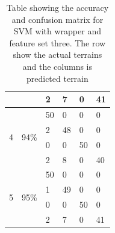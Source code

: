 \documentclass[USenglish]{ifimaster}  %
\begin{document}
\begin{table}[h]
\begin{tabular}{@{}llllll@{}}
			\multicolumn{1}{l|}{} & \multicolumn{1}{l|}{} & \multicolumn{1}{l|}{2} & \multicolumn{1}{l|}{7} & \multicolumn{1}{l|}{0} & 41 \\ \midrule
			\multicolumn{1}{l|}{\multirow{4}{*}{4}} & \multicolumn{1}{l|}{\multirow{4}{*}{94\%}} & \multicolumn{1}{l|}{50} & \multicolumn{1}{l|}{0} & \multicolumn{1}{l|}{0} & 0 \\ \cmidrule(l){3-6} 
			\multicolumn{1}{l|}{} & \multicolumn{1}{l|}{} & \multicolumn{1}{l|}{2} & \multicolumn{1}{l|}{48} & \multicolumn{1}{l|}{0} & 0 \\ \cmidrule(l){3-6} 
			\multicolumn{1}{l|}{} & \multicolumn{1}{l|}{} & \multicolumn{1}{l|}{0} & \multicolumn{1}{l|}{0} & \multicolumn{1}{l|}{50} & 0 \\ \cmidrule(l){3-6} 
			\multicolumn{1}{l|}{} & \multicolumn{1}{l|}{} & \multicolumn{1}{l|}{2} & \multicolumn{1}{l|}{8} & \multicolumn{1}{l|}{0} & 40 \\ \midrule
			\multicolumn{1}{l|}{\multirow{4}{*}{5}} & \multicolumn{1}{l|}{\multirow{4}{*}{95\%}} & \multicolumn{1}{l|}{50} & \multicolumn{1}{l|}{0} & \multicolumn{1}{l|}{0} & 0 \\ \cmidrule(l){3-6} 
			\multicolumn{1}{l|}{} & \multicolumn{1}{l|}{} & \multicolumn{1}{l|}{1} & \multicolumn{1}{l|}{49} & \multicolumn{1}{l|}{0} & 0 \\ \cmidrule(l){3-6} 
			\multicolumn{1}{l|}{} & \multicolumn{1}{l|}{} & \multicolumn{1}{l|}{0} & \multicolumn{1}{l|}{0} & \multicolumn{1}{l|}{50} & 0 \\ \cmidrule(l){3-6} 
			\multicolumn{1}{l|}{} & \multicolumn{1}{l|}{} & \multicolumn{1}{l|}{2} & \multicolumn{1}{l|}{7} & \multicolumn{1}{l|}{0} & 41 \\ \bottomrule
		\end{tabular}
		\caption{Table showing the accuracy and confusion matrix for SVM with wrapper and feature set three. The row show the actual terrains and the columns is predicted terrain}
		\label{svmexp}
	\end{table}
	\FloatBarrier
\end{document}

